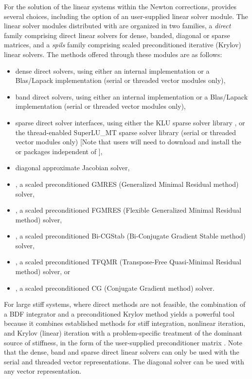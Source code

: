 For the solution of the linear systems within the Newton corrections, 
{\cvode} provides several choices, including the option of an user-supplied
linear solver module. The linear solver modules distributed with {\sundials}
are organized in two families, a {\em direct} family comprising direct linear 
solvers for dense, banded, diagonal or sparse matrices, and a {\em spils}
family comprising scaled preconditioned iterative (Krylov) linear
solvers. 
The methods offered through these modules are as follows:
\begin{itemize}
\item dense direct solvers, using either an internal implementation or 
  a Blas/Lapack implementation (serial or threaded vector modules only),
\item band direct solvers, using either an internal implementation or 
  a Blas/Lapack implementation (serial or threaded vector modules only),
\item sparse direct solver interfaces, using either the KLU sparse solver
  library \cite{DaPa:10,KLU_site}, or the thread-enabled SuperLU\_MT sparse
  solver library \cite{Li:05,DGL:99,SuperLUMT_site} (serial or threaded 
  vector modules only) [Note that users will need to download and install the 
  {\klu} or {\superlumt} packages independent of {\cvode}],
\item diagonal approximate Jacobian solver,
\item {\spgmr}, a scaled preconditioned GMRES (Generalized Minimal Residual method)
  solver,
\item {\spfgmr}, a scaled preconditioned FGMRES (Flexible Generalized
  Minimal Residual method) solver,
\item {\spbcg}, a scaled preconditioned Bi-CGStab (Bi-Conjugate Gradient Stable
  method) solver,
\item {\sptfqmr}, a scaled preconditioned TFQMR (Transpose-Free Quasi-Minimal
  Residual method) solver, or
\item {\pcg}, a scaled preconditioned CG (Conjugate Gradient method) solver.
\end{itemize}
For large stiff systems, where direct methods are not feasible, the
combination of a BDF integrator and a preconditioned Krylov
method yields a powerful tool
because it combines established methods for stiff integration,
nonlinear iteration, and Krylov (linear) iteration with a
problem-specific treatment of the dominant source of stiffness, in the
form of the user-supplied preconditioner matrix \cite{BrHi:89}.
Note that the dense, band and sparse direct linear solvers can only be 
used with the serial and threaded vector representations.  The
diagonal solver can be used with any vector representation.

